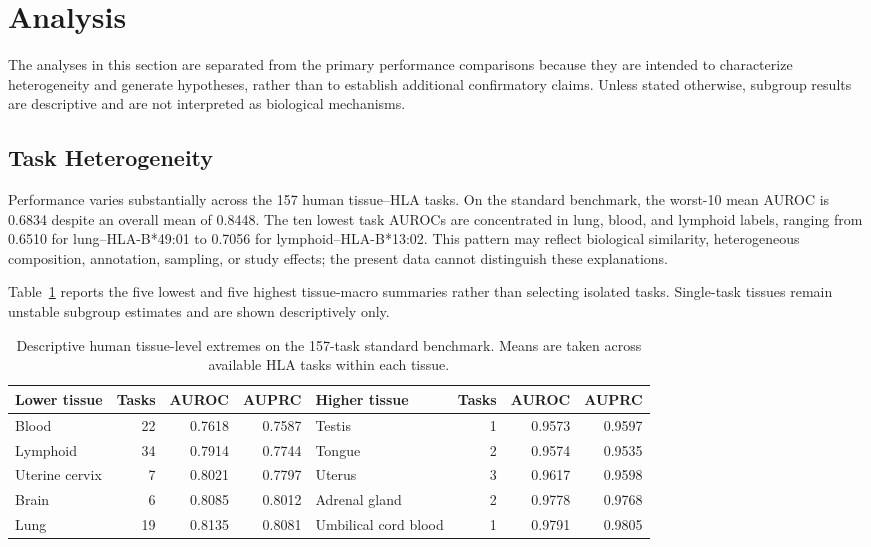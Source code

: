 \section{Analysis}

The analyses in this section are separated from the primary performance comparisons because they are intended to characterize heterogeneity and generate hypotheses, rather than to establish additional confirmatory claims. Unless stated otherwise, subgroup results are descriptive and are not interpreted as biological mechanisms.

\subsection{Task Heterogeneity}

Performance varies substantially across the 157 human tissue--HLA tasks. On the standard benchmark, the worst-10 mean AUROC is 0.6834 despite an overall mean of 0.8448. The ten lowest task AUROCs are concentrated in lung, blood, and lymphoid labels, ranging from 0.6510 for lung--HLA-B*49:01 to 0.7056 for lymphoid--HLA-B*13:02. This pattern may reflect biological similarity, heterogeneous composition, annotation, sampling, or study effects; the present data cannot distinguish these explanations.

Table~\ref{tab:human-tissue-extremes} reports the five lowest and five highest tissue-macro summaries rather than selecting isolated tasks. Single-task tissues remain unstable subgroup estimates and are shown descriptively only.

\begin{table}[tbp]
\centering
\caption{Descriptive human tissue-level extremes on the 157-task standard benchmark. Means are taken across available HLA tasks within each tissue.}
\label{tab:human-tissue-extremes}
\footnotesize
\setlength{\tabcolsep}{2pt}
\begin{tabular}{lrrrlrrr}
\toprule
Lower tissue & Tasks & AUROC & AUPRC & Higher tissue & Tasks & AUROC & AUPRC \\ 
\midrule
Blood & 22 & 0.7618 & 0.7587 & Testis & 1 & 0.9573 & 0.9597 \\ 
Lymphoid & 34 & 0.7914 & 0.7744 & Tongue & 2 & 0.9574 & 0.9535 \\ 
Uterine cervix & 7 & 0.8021 & 0.7797 & Uterus & 3 & 0.9617 & 0.9598 \\ 
Brain & 6 & 0.8085 & 0.8012 & Adrenal gland & 2 & 0.9778 & 0.9768 \\ 
Lung & 19 & 0.8135 & 0.8081 & Umbilical cord blood & 1 & 0.9791 & 0.9805 \\ 
\bottomrule
\end{tabular}
\end{table}

